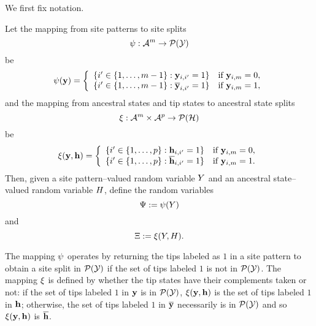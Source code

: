 We first fix notation.
\begin{definition}
Let the mapping from site patterns to site splits
\[
\psi:\mathcal{A}^m\rightarrow\mathcal{P}(\mathcal{Y})
\]
be
\[
\psi(\mathbf{y}) =
\left\{
    \begin{array}{ll}
        \{i'\in\{1,\ldots,m-1\}: \mathbf{y}_{i,i'}=1\}  & \mbox{if } \mathbf{y}_{i,m}=0,\\
        \{i'\in\{1,\ldots,m-1\}: \overline{\mathbf{y}}_{i,i'}=1\}  & \mbox{if } \mathbf{y}_{i,m}=1,
    \end{array}
\right.
\]
and the mapping from ancestral states and tip states to ancestral state splits
\[
\xi:\mathcal{A}^m\times\mathcal{A}^p\rightarrow\mathcal{P}(\mathcal{H})
\]
be
\[
\xi(\mathbf{y}, \mathbf{h}) =
\left\{
    \begin{array}{ll}
        \{i'\in\{1,\ldots,p\}: \mathbf{h}_{i,i'}=1\}  & \mbox{if } \mathbf{y}_{i,m}=0,\\
        \{i'\in\{1,\ldots,p\}: \overline{\mathbf{h}}_{i,i'}=1\}  & \mbox{if } \mathbf{y}_{i,m}=1.
    \end{array}
\right.
\]
Then, given a site pattern--valued random variable $Y$ and an ancestral state--valued random variable $H$, define the random variables
\[
\Psi := \psi(Y)
\]
and
\[
\Xi := \xi(Y, H).
\]
\end{definition}
The mapping $\psi$ operates by returning the tips labeled as $1$ in a site pattern to obtain a site split in $\mathcal{P}(\mathcal{Y})$ if the set of tips labeled $1$ is not in $\mathcal{P}(\mathcal{Y})$.
The mapping $\xi$ is defined by whether the tip states have their complements taken or not: if the set of tips labeled $1$ in $\mathbf{y}$ is in $\mathcal{P}(\mathcal{Y})$, $\xi(\mathbf{y}, \mathbf{h})$ is the set of tips labeled $1$ in $\mathbf{h}$; otherwise, the set of tips labeled $1$ in $\overline{\mathbf{y}}$ necessarily is in $\mathcal{P}(\mathcal{Y})$ and so $\xi(\mathbf{y}, \mathbf{h})$ is $\overline{\mathbf{h}}$.

